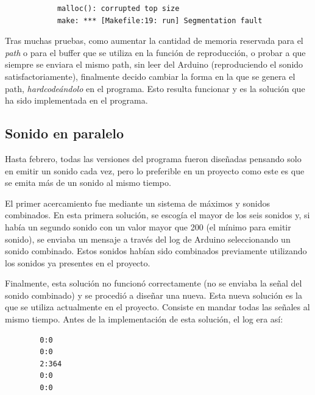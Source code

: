 \documentclass{article}
\begin{document}
\begin{itemize}
            \begin{verbatim}
            malloc(): corrupted top size
            make: *** [Makefile:19: run] Segmentation fault
            \end{verbatim}

            Tras muchas pruebas, como aumentar la cantidad de memoria reservada para el \textit{path} o para el
            buffer que se utiliza en la función de reproducción, o probar a que siempre se enviara el mismo path,
            sin leer del Arduino (reproduciendo el sonido satisfactoriamente), finalmente decido cambiar la forma en
            la que se genera el path, \textit{hardcodeándolo} en el programa. Esto resulta funcionar y es la solución
            que ha sido implementada en el programa.
        \end{itemize}


    \subsection{Sonido en paralelo} %
    \label{sub:SonidoEnParalelo}

        Hasta febrero, todas las versiones del programa fueron diseñadas pensando solo en emitir un sonido cada vez,
        pero lo preferible en un proyecto como este es que se emita más de un sonido al mismo tiempo.\newline

        El primer acercamiento fue mediante un sistema de máximos y sonidos combinados. En esta primera solución, se
        escogía el mayor de los seis sonidos y, si había un segundo sonido con un valor mayor que 200 (el mínimo para
        emitir sonido), se enviaba un mensaje a través del log de Arduino seleccionando un sonido combinado. Estos
        sonidos habían sido combinados previamente utilizando los sonidos ya presentes en el proyecto.\newline

        Finalmente, esta solución no funcionó correctamente (no se enviaba la señal del sonido combinado) y se procedió
        a diseñar una nueva. Esta nueva solución es la que se utiliza actualmente en el proyecto. Consiste en mandar
        todas las señales al mismo tiempo. Antes de la implementación de esta solución, el log era así:

        \begin{verbatim}
        0:0
        0:0
        2:364
        0:0
        0:0
        \end{verbatim}
\end{document}
